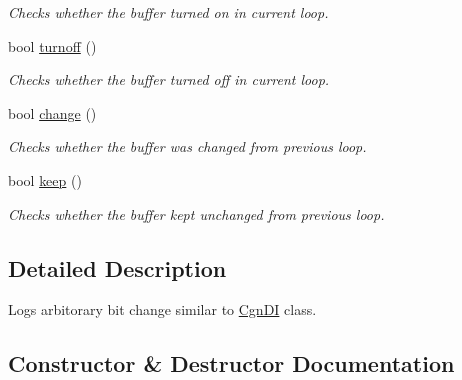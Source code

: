 \begin{DoxyCompactItemize}
\begin{DoxyCompactList}\small\item\em Checks whether the buffer turned on in current loop. \end{DoxyCompactList}\item 
bool \hyperlink{classCgnLogger_ab05a8d3bc157ed6e1a5397a7fe8a443f}{turnoff} ()\hypertarget{classCgnLogger_ab05a8d3bc157ed6e1a5397a7fe8a443f}{}\label{classCgnLogger_ab05a8d3bc157ed6e1a5397a7fe8a443f}

\begin{DoxyCompactList}\small\item\em Checks whether the buffer turned off in current loop. \end{DoxyCompactList}\item 
bool \hyperlink{classCgnLogger_a16e3dfb62d1dc8b1cdebfccb37111681}{change} ()\hypertarget{classCgnLogger_a16e3dfb62d1dc8b1cdebfccb37111681}{}\label{classCgnLogger_a16e3dfb62d1dc8b1cdebfccb37111681}

\begin{DoxyCompactList}\small\item\em Checks whether the buffer was changed from previous loop. \end{DoxyCompactList}\item 
bool \hyperlink{classCgnLogger_afdca8036a131c8e0622efeefec4549d7}{keep} ()\hypertarget{classCgnLogger_afdca8036a131c8e0622efeefec4549d7}{}\label{classCgnLogger_afdca8036a131c8e0622efeefec4549d7}

\begin{DoxyCompactList}\small\item\em Checks whether the buffer kept unchanged from previous loop. \end{DoxyCompactList}\end{DoxyCompactItemize}


\subsection{Detailed Description}
Logs arbitorary bit change similar to \hyperlink{classCgnDI}{Cgn\+DI} class. 

\subsection{Constructor \& Destructor Documentation}
